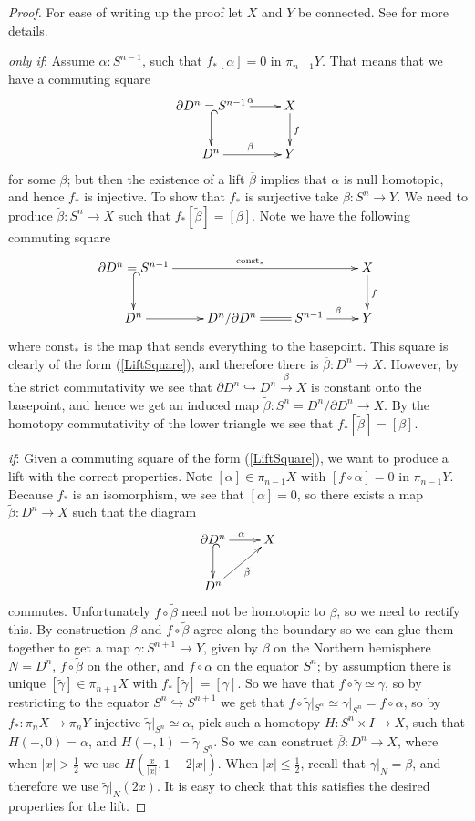 \documentclass{article}
\newtheorem{proposed work}[theorem]{Proposed Work}
\theoremstyle{definition}
\newcommand{\xymat}[1]{\begin{align*}\xymatrix{ #1}\end{align*}}
\begin{document}
\begin{proof}
For ease of writing up the proof let $X$ and $Y$ be connected. See \cite{may1999concise} for more details.

\emph{only if}: Assume $\alpha: S^{n-1}$, such that $f_*[\alpha]=0$ in $\pi_{n-1}Y$. That means that we have a commuting square 
\xymat{\partial D^n=S^{n-1} \ar[r]^\alpha \ar@{^{(}->}[d] & X \ar[d]^f \\ D^n \ar[r]^\beta & Y} for some $\beta$; but then the existence of a lift $\overline{\beta}$ implies that $\alpha$ is null homotopic, and hence $f_*$ is injective. To show that $f_*$ is surjective take $\beta: S^n\to Y$. We need to produce $\tilde{\beta}: S^n\to X$ such that $f_*[\tilde{\beta}]=[\beta]$. Note we have the following commuting square
\xymat{\partial D^n=S^{n-1} \ar[rrr]^{\text{const}_*} \ar@{^{(}->}[d]& & & X \ar[d]^f \\ D^n \ar[r] & D^n/\partial D^n \ar@{=}[r]&S^{n-1} \ar[r]^\beta & Y}
where $\text{const}_*$ is the map that sends everything to the basepoint. This square is clearly of the form (\ref{LiftSquare}), and therefore there is $\overline{\beta}: D^n \to X$. However, by the strict commutativity we see that $\partial D^n \hookrightarrow D^n \stackrel{\beta}{\to} X$ is constant onto the basepoint, and hence we get an induced map $\tilde{\beta}:S^n=D^n/\partial D^n \to X$. By the homotopy commutativity of the lower triangle we see that $f_*[\tilde{\beta}]=[\beta]$.

\emph{if}: Given a commuting square of the form (\ref{LiftSquare}), we want to produce a lift with the correct properties. Note $[\alpha]\in\pi_{n-1} X$ with $[f\circ \alpha]=0$ in $\pi_{n-1} Y$. Because $f_*$ is an isomorphism, we see that $[\alpha]=0$, so there exists a map $\tilde{\beta}:D^n\to X$ such that the diagram
\xymat{\partial D^n \ar@{^{(}->}[d] \ar[r]^\alpha & X \\ D^n\ar[ur]_{\tilde{\beta}}}
commutes. Unfortunately $f\circ \tilde{\beta}$ need not be homotopic to $\beta$, so we need to rectify this. By construction $\beta$ and $f\circ \tilde{\beta}$ agree along the boundary so we can glue them together to get a map $\gamma: S^{n+1}\to Y$, given by $\beta$ on the Northern hemisphere $N=D^n$, $f\circ \tilde{\beta}$ on the other, and $f\circ \alpha$ on the equator $S^n$; by assumption there is unique $[\tilde{\gamma}]\in \pi_{n+1}X$ with $f_*[\tilde{\gamma}]=[\gamma]$. So we have that $f\circ \tilde{\gamma}\simeq \gamma$, so by restricting to the equator $S^n\hookrightarrow S^{n+1}$ we get
that $f\circ \tilde{\gamma}|_{S^n}\simeq \gamma|_{S^n}= f\circ \alpha$, so by $f_*:\pi_nX \to \pi_nY$ injective $\tilde{\gamma}|_{S^n}\simeq \alpha$, pick such a homotopy $H:S^n\times I \to X$, such that $H(-,0)=\alpha$, and $H(-,1)=\tilde{\gamma}|_{S^n}$. 
So we can construct $\overline{\beta}: D^n\to X$, where when $|x|>\frac{1}{2}$ we use $H(\frac{x}{|x|}, 1-2|x|)$. When $|x| \leq \frac{1}{2}$, recall that $\gamma|_N=\beta$, and therefore we use $\tilde{\gamma}|_N(2x)$.
 It is easy to check that this satisfies the desired properties for the lift.
\end{proof}
\end{document}
